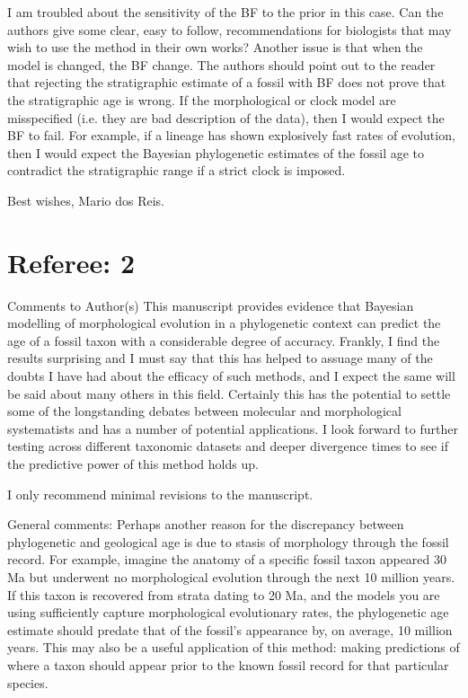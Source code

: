 \documentclass[11pt]{article}
\begin{document}
I am troubled about the sensitivity of the BF to the prior in this case. Can the authors give some clear, easy to follow, recommendations for biologists that may wish to use the method in their own works? Another issue is that when the model is changed, the BF change. The authors should point out to the reader that rejecting the stratigraphic estimate of a fossil with BF does not prove that the stratigraphic age is wrong. If the morphological or clock model are misspecified (i.e. they are  bad description of the data), then I would expect the BF to fail. For example, if a lineage has shown explosively fast rates of evolution, then I would expect the Bayesian phylogenetic estimates of the fossil age to contradict the stratigraphic range if a strict clock is imposed.

Best wishes,
Mario dos Reis.

\section*{Referee: 2}

Comments to Author(s)
This manuscript provides evidence that Bayesian modelling of morphological evolution in a phylogenetic context can predict the age of a fossil taxon with a considerable degree of accuracy. Frankly, I find the results surprising and I must say that this has helped to assuage many of the doubts I have had about the efficacy of such methods, and I expect the same will be said about many others in this field. Certainly this has the potential to settle some of the longstanding debates between molecular and morphological systematists and has a number of potential applications. I look forward to further testing across different taxonomic datasets and deeper divergence times to see if the predictive power of this method holds up. 

I only recommend minimal revisions to the manuscript.

General comments:
Perhaps another reason for the discrepancy between phylogenetic and geological age is due to stasis of morphology through the fossil record. For example, imagine the anatomy of a specific fossil taxon appeared 30 Ma but underwent no morphological evolution through the next 10 million years. If this taxon is recovered from strata dating to 20 Ma, and the models you are using sufficiently capture morphological evolutionary rates, the phylogenetic age estimate should predate that of the fossil's appearance by, on average, 10 million years. This may also be a useful application of this method: making predictions of where a taxon should appear prior to the known fossil record for that particular species.
\end{document}
